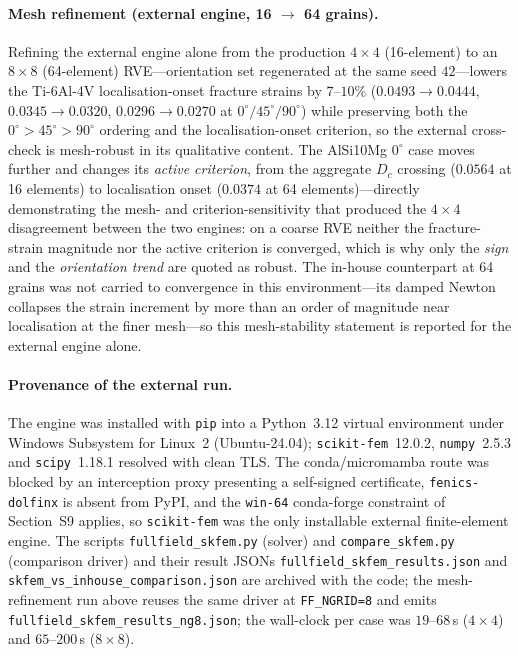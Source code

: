 \documentclass[12pt,a4paper,twocolumn]{article}
\providecommand{\ang}[1]{\ensuremath{#1^{\circ}}}
\begin{document}
\paragraph{Mesh refinement (external engine, 16 $\to$ 64 grains).}
Refining the external engine alone from the production $4\times4$ (16-element) to an $8\times8$ (64-element)
RVE---orientation set regenerated at the same seed $42$---lowers the Ti-6Al-4V localisation-onset fracture
strains by $7$--$10\%$ ($0.0493\to0.0444$, $0.0345\to0.0320$, $0.0296\to0.0270$ at $\ang{0}/\ang{45}/\ang{90}$)
while preserving both the $\ang{0}>\ang{45}>\ang{90}$ ordering and the localisation-onset criterion, so the
external cross-check is mesh-robust in its qualitative content. The AlSi10Mg $\ang{0}$ case moves further and
changes its \emph{active criterion}, from the aggregate $D_c$ crossing ($0.0564$ at 16 elements) to localisation
onset ($0.0374$ at 64 elements)---directly demonstrating the mesh- and criterion-sensitivity that produced the
$4\times4$ disagreement between the two engines: on a coarse RVE neither the fracture-strain magnitude nor the
active criterion is converged, which is why only the \emph{sign} and the \emph{orientation trend} are quoted as
robust. The in-house counterpart at 64 grains was not carried to convergence in this environment---its damped
Newton collapses the strain increment by more than an order of magnitude near localisation at the finer mesh---so
this mesh-stability statement is reported for the external engine alone.

\paragraph{Provenance of the external run.} The engine was installed with \texttt{pip} into a Python~3.12
virtual environment under Windows Subsystem for Linux~2 (Ubuntu-24.04); \texttt{scikit-fem}~12.0.2,
\texttt{numpy}~2.5.3 and \texttt{scipy}~1.18.1 resolved with clean TLS. The conda/micromamba route was blocked
by an interception proxy presenting a self-signed certificate, \texttt{fenics-dolfinx} is absent from PyPI,
and the \texttt{win-64} conda-forge constraint of Section~S9 applies, so \texttt{scikit-fem} was the only
installable external finite-element engine. The scripts \texttt{fullfield\_skfem.py} (solver) and
\texttt{compare\_skfem.py} (comparison driver) and their result JSONs \texttt{fullfield\_skfem\_results.json}
and \texttt{skfem\_vs\_inhouse\_comparison.json} are archived with the code; the mesh-refinement run above reuses
the same driver at \texttt{FF\_NGRID=8} and emits \texttt{fullfield\_skfem\_results\_ng8.json}; the wall-clock per
case was $19$--$68$\,s ($4\times4$) and $65$--$200$\,s ($8\times8$).
\end{document}
